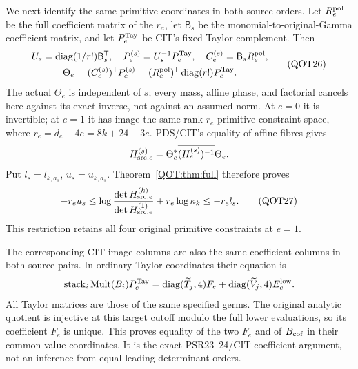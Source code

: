 \documentclass[11pt,a4paper]{article}
\begin{document}
We next identify the same primitive coordinates in both source orders. Let $R_e^{\rm pol}$ be the full coefficient matrix of the $r_a$, let $\mathsf B_s$ be the monomial-to-original-Gamma coefficient matrix, and let $P_e^{\rm Tay}$ be CIT's fixed Taylor complement. Then
\begin{equation}
\begin{gathered}
 U_s=\operatorname{diag}(1/r!)\mathsf B_s^{\mathsf T},\quad
 P_e^{(s)}=U_s^{-1}P_e^{\rm Tay},\quad C_e^{(s)}=\mathsf B_sR_e^{\rm pol},\\
 \Theta_e=(C_e^{(s)})^{\mathsf T}P_e^{(s)}
 =(R_e^{\rm pol})^{\mathsf T}\operatorname{diag}(r!)P_e^{\rm Tay}.
\end{gathered}\label{QOT:eq:Theta}
\tag{QOT26}
\end{equation}
The actual $\Theta_e$ is independent of $s$; every mass, affine phase, and factorial cancels here against its exact inverse, not against an assumed norm. At $e=0$ it is invertible; at $e=1$ it has image the same rank-$r_e$ primitive constraint space, where $r_e=d_e-4e=8k+24-3e$. PDS/CIT's equality of affine fibres gives
\[
 H_{{\rm src},e}^{(s)}=\Theta_e^*\overline{(H_e^{(s)})^{-1}}\Theta_e.
\]
Put $l_s=l_{k,a_s}$, $u_s=u_{k,a_s}$. Theorem~\ref{QOT:thm:full} therefore proves
\begin{equation}
 -r_eu_s\le
 \log\frac{\det H_{{\rm src},e}^{(k)}}{\det H_{{\rm src},e}^{(1)}}
       +r_e\log\kappa_k
 \le-r_el_s.
 \label{QOT:eq:sourceorder}
\tag{QOT27}
\end{equation}
This restriction retains all four original primitive constraints at $e=1$.

The corresponding CIT image columns are also the same coefficient columns in both source pairs. In ordinary Taylor coordinates their equation is
\[
 \operatorname{stack}_i\operatorname{Mult}(B_i)P_e^{\rm Tay}
 =\operatorname{diag}(\widetilde T_j,4)F_e
   +\operatorname{diag}(\widetilde V_j,4)E_e^{\rm low}.
\]
All Taylor matrices are those of the same specified germs. The original analytic quotient is injective at this target cutoff modulo the full lower evaluations, so its coefficient $F_e$ is unique. This proves equality of the two $F_e$ and of $B_{\rm cof}$ in their common value coordinates. It is the exact PSR23--24/CIT coefficient argument, not an inference from equal leading determinant orders.
\end{document}

